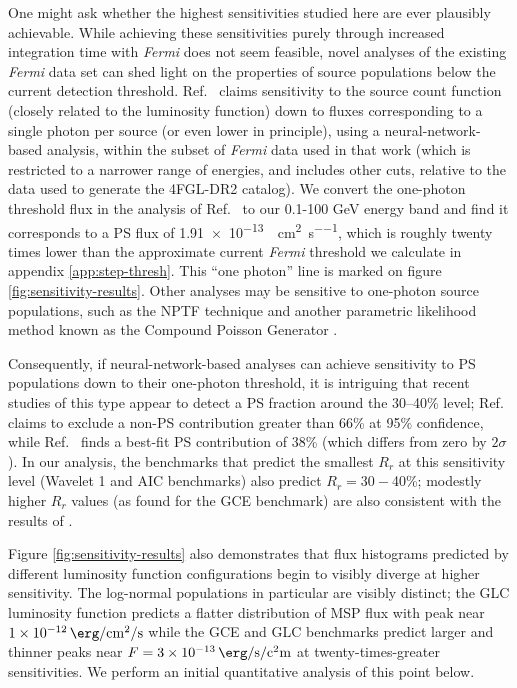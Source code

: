 \documentclass[letter,11pt]{article}
\begin{document}
One might ask whether the highest sensitivities studied here are ever plausibly achievable. While achieving these sensitivities purely through increased integration time with \textit{Fermi} does not seem feasible, novel analyses of the existing \textit{Fermi} data set can shed light on the properties of source populations below the current detection threshold. Ref.~\cite{List:2021aer} claims sensitivity to the source count function (closely related to the luminosity function) down to fluxes corresponding to a single photon per source (or even lower in principle), using a neural-network-based analysis, within the subset of \textit{Fermi} data used in that work (which is restricted to a narrower range of energies, and includes other cuts, relative to the data used to generate the 4FGL-DR2 catalog). We convert the one-photon threshold flux in the analysis of Ref.~\cite{List:2021aer}  to our 0.1-100 GeV energy band and find it corresponds to a PS flux of \SI{1.91e-13} {\erg\per\centi\meter\squared\per\second}, which is roughly twenty times lower than the approximate current \textit{Fermi} threshold we calculate in appendix \ref{app:step-thresh}. This ``one photon'' line is marked on figure \ref{fig:sensitivity-results}. Other analyses may be sensitive to one-photon source populations, such as the NPTF technique \cite{Chang:2019ars} and another parametric likelihood method known as the Compound Poisson Generator \cite{Collin:2021ufc}.

Consequently, if neural-network-based analyses can achieve sensitivity to PS populations down to their one-photon threshold, it is intriguing that recent studies of this type appear to detect a PS fraction around the 30--40\% level; Ref.~\cite{List:2021aer} claims to exclude a non-PS contribution greater than 66\% at 95\% confidence, while Ref.~\cite{Mishra-Sharma:2021oxe} finds a best-fit PS contribution of 38\% (which differs from zero by $2\sigma$). In our analysis, the benchmarks that predict the smallest $R_r$ at this sensitivity level (Wavelet 1 and AIC benchmarks) also predict $R_r=30-$40\%; modestly higher $R_r$ values (as found for the GCE benchmark) are also consistent with the results of \cite{List:2021aer, Mishra-Sharma:2021oxe}. 

Figure \ref{fig:sensitivity-results} also demonstrates that flux histograms predicted by different luminosity function configurations begin to visibly diverge at higher sensitivity. The log-normal populations in particular are visibly distinct; the GLC luminosity function predicts a flatter distribution of MSP flux with peak near $\SI{1e-12}{\erg\per\centi\meter\squared\per\second}$ while the GCE and GLC benchmarks predict larger and thinner peaks near $F=\SI{3e-13}{\erg\per\second\per\square\centi\meter}$ at twenty-times-greater sensitivities. We perform an initial quantitative analysis of this point below.
\end{document}

